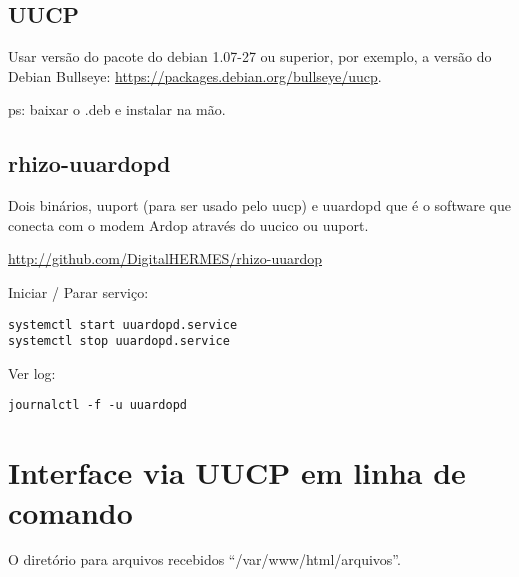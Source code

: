 \documentclass[11pt,a4paper]{article}
\begin{document}
\subsection{UUCP}

Usar versão do pacote do debian 1.07-27 ou superior, por exemplo, a versão
do Debian Bullseye: \url{https://packages.debian.org/bullseye/uucp}.

ps: baixar o .deb e instalar na mão.

\subsection{rhizo-uuardopd}


Dois binários, uuport (para ser usado pelo uucp) e uuardopd que é o software
que conecta com o modem Ardop através do uucico ou uuport.

\url{http://github.com/DigitalHERMES/rhizo-uuardop}


Iniciar / Parar serviço:
\begin{verbatim}
systemctl start uuardopd.service
systemctl stop uuardopd.service
\end{verbatim}


Ver log:
\begin{verbatim}
journalctl -f -u uuardopd
\end{verbatim}




\section{Interface via UUCP em linha de comando}

O diretório para arquivos recebidos ``/var/www/html/arquivos''.
\end{document}
